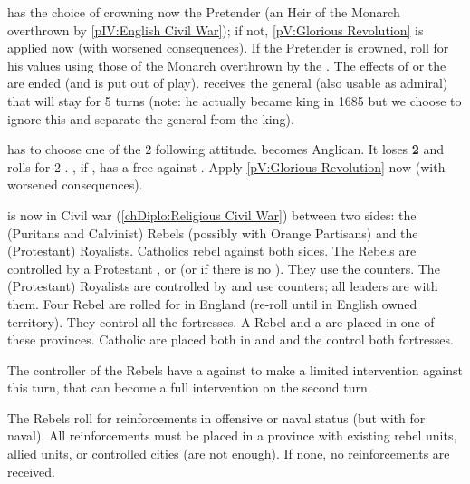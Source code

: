 
\phevnt
\aparag \ENG has the choice of crowning now the Pretender (an Heir of the
Monarch overthrown by \ref{pIV:English Civil War}); if not, \ref{pV:Glorious
  Revolution} is applied now (with worsened consequences).
\aparag If the Pretender is crowned, roll for his values using those of the
Monarch overthrown by the . The effects of
 or the  are ended (and
\leaderCromwell is put out of play).
\aparag \ENG receives the general (also usable as admiral)  that will stay for 5 turns (note: he actually became king in 1685 but
we choose to ignore this and separate the general from the king).



\phevnt
\aparag \ENG has to choose one of the 2 following attitude.
\bparag \ENG becomes Anglican. It loses {\bf 2} \STAB and rolls for 2 \REVOLT
.
\bparag \SPA, if \CATHCR, has a free \CB against \ENG.
\aparag[Refusal]
\bparag Apply \ref{pV:Glorious Revolution} now (with worsened consequences).



\phevnt
\aparag \ENG is now in Civil war (\ref{chDiplo:Religious Civil War}) between
two sides: the (Puritans and Calvinist) Rebels (possibly with Orange
Partisans) and the (Protestant) Royalists. Catholics rebel against both sides.
\bparag The Rebels are controlled by a Protestant \FRA, or \HOL (or \SUE if
there is no \HOL). They use the \paysroyalistes counters.
\bparag The (Protestant) Royalists are controlled by \ENG and use \ENG
counters; all \ENG leaders are with them.
\aparag Four Rebel \REVOLT are rolled for in England (re-roll until in English
owned territory). They control all the fortresses.
\bparag A Rebel \ARMY \facemoins and a \LeaderG are placed in one of these
provinces.
\aparag Catholic \REVOLT \faceplus are placed both in \provinceConnacht and
\provinceMumhan and the \REVOLT control both fortresses.

\phdipl
\aparag The controller of the Rebels have a \CB against \ENG to make a limited
intervention against \ENG this turn, that can become a full intervention on
the second turn.

\phadm
\aparag The Rebels roll for reinforcements in offensive or naval status (but
with  for naval).
\aparag All reinforcements must be placed in a province with existing rebel
units, allied units, or controlled cities (\REVOLT are not enough). If none,
no reinforcements are received.

